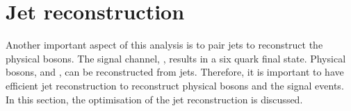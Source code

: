 \section{Jet reconstruction}

Another important aspect of this analysis is to pair jets to reconstruct the physical bosons. The signal channel, \eeToHHbbWWHad, results in a six quark final state. Physical bosons,  \PW and \PHiggs, can be reconstructed from jets. Therefore, it is important to have efficient jet reconstruction to reconstruct physical bosons and the signal events. In this section, the optimisation of the jet reconstruction is discussed.




